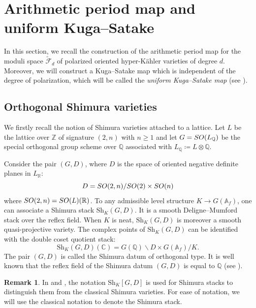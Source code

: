 \documentclass[11pt,reqno,oneside]{amsart}
\numberwithin{equation}{section}
\theoremstyle{definition}
\newtheorem{remark}[theorem]{Remark}
\newcommand{\SO}{{\rm SO}}
\newcommand{\Sh}{\mathrm{Sh}}
\newcommand{\scF}{\mathscr{F}}
\newcommand{\CC}{\mathbb{C}}
\newcommand{\QQ}{\mathbb{Q}}
\newcommand{\RR}{\mathbb{R}}
\newcommand{\ZZ}{\mathbb{Z}}
\begin{document}
\section{Arithmetic period map and uniform Kuga--Satake}
\label{sec:ArithPerMap}

In this section, we recall the construction of the arithmetic period map for the moduli space $\widetilde{\scF}_{d}$ of polarized oriented hyper-Kähler varieties of degree $d$. Moreover, we will construct a Kuga--Satake map which is independent of the degree of polarization, which will be called the \emph{uniform Kuga--Satake map} (see ). %

\subsection{Orthogonal Shimura varieties} 
We firstly recall the notion of Shimura varieties attached to a lattice. Let $L$ be the lattice over $\ZZ$ of signature $(2, n)$ with $n \geq 1$ and let $G=\SO(L_\QQ)$ be the special orthogonal group scheme over $\QQ$ associated with $L_{\QQ}\coloneqq L\otimes \QQ$. 

Consider the pair $(G,D)$, where $D$ is the space of oriented negative definite planes in $L_{\RR}$:
\[ 
D = \SO(2,n) / \SO(2) \times \SO(n)
\]
where $\SO(2,n) = \SO(L)(\RR)$.
To any admissible level structure $K\to G(\mathbb{A}_f)$, one can associate a Shimura stack $\Sh_K(G,D)$. It is a smooth Deligne--Mumford stack over the reflex field. When $K$ is neat, $\Sh_K(G,D)$ is moreover a smooth quasi-projective variety. The complex points of $\Sh_K(G,D)$ can be identified with the double coset quotient stack:
\begin{equation}\Sh_K(G, D)(\CC)=G(\QQ)\backslash D\times G(\mathbb{A}_f)/K.
\end{equation}
The pair $(G,D)$ is called the Shimura datum of orthogonal type. 
It is well known that the reflex field of the Shimura datum $(G,D)$ is equal to $\QQ$ (see \cite[Appendix]{A96}). 
\begin{remark}
In \cite{taelman17} and \cite{BindtThesis}, the notation $\Sh_K[G,D]$ is used for Shimura stacks to distinguish them from the classical Shimura varieties. For ease of notation, we will use the classical notation to denote the Shimura stack.
\end{remark}
\end{document}

